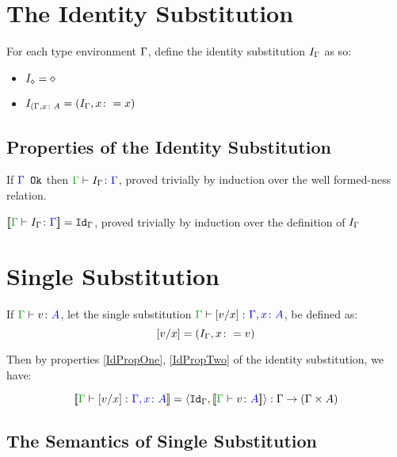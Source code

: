 \documentclass{report}
\begin{document}
\section{The Identity Substitution}
For each type environment $\G$, define the identity substitution $I_{\G}$ as so:

\begin{itemize}
    \item $I_{\nil} = \nil$
    \item $I_{(\gax} = (I_{\G}, x\setto x)$
\end{itemize}

\subsection{Properties of the Identity Substitution}


\begin{property}[Wellformedness]\label{IdPropOne}
    If $\ok{\G}$ then $\typerelation{\G}{I_{\G}}{\G}$, proved trivially by induction over the well formed-ness relation.
\end{property}



\begin{property}[Denotation]\label{IdPropTwo}
    $\deno{\typerelation{\G}{I_{\G}}{\G}} = \idg$, proved trivially by induction over the definition of $I_{\G}$
\end{property}

\section{Single Substitution}

If $\typerelation{\G}{v}{A}$, let the single substitution $\typerelation{\G}{\ssub{x}{v}}{\gax}$, be defined as:
\begin{equation}
    \ssub{x}{v} = (I_{\G}, x\setto v)
\end{equation}

Then by properties \ref{IdPropOne}, \ref{IdPropTwo} of the identity substitution, we have:

\begin{equation}
    \deno{\gtyperelation{\ssub{x}{v}}{\gax}} = \pr{\idg}{\deno{\gtyperelation{v}{A}}}: \G\rightarrow(\G\times A)
\end{equation}

\subsection{The Semantics of Single Substitution}
\end{document}

